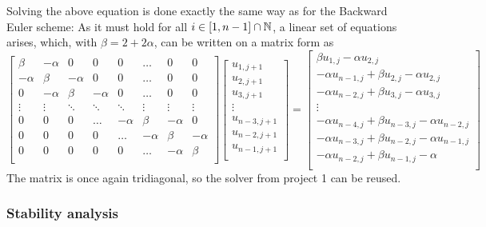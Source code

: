 \documentclass[12pt,english,a4paper]{article}
\begin{document}
Solving the above equation is done exactly the same way as for the Backward Euler scheme: As it must hold for all \(i\in\qty[1,n-1]\cap\mathbb{N}\), a linear set of equations arises, which, with \(\beta=2+2\alpha\), can be written on a matrix form as
\[
    \begin{bmatrix}
        \beta & -\alpha & 0 & 0 & 0 & \dots & 0 & 0  \\
        -\alpha & \beta & -\alpha & 0 & 0 & \dots & 0 & 0  \\
        0 & -\alpha & \beta & -\alpha & 0 & \dots & 0 & 0 \\
        \vdots & \vdots &  \ddots & \ddots & \ddots & \vdots & \vdots & \vdots\\
        0 & 0 & 0 & \dots & -\alpha & \beta & - \alpha & 0\\
        0 & 0 & 0 & 0 & \dots & -\alpha & \beta & - \alpha\\
        0 & 0 & 0 & 0 & 0 & \dots & -\alpha & \beta\\
    \end{bmatrix}
    \begin{bmatrix}
        u_{1,j+1}\\
        u_{2,j+1}\\
        u_{3,j+1}\\
        \vdots\\
        u_{n-3,j+1}\\
        u_{n-2,j+1}\\
        u_{n-1,j+1}\\
    \end{bmatrix}
    =
    \begin{bmatrix}
        \beta u_{1,j} - \alpha u_{2,j}\\
        -\alpha u_{n-1,j} + \beta u_{2,j} - \alpha u_{2,j}\\
        -\alpha u_{n-2,j} + \beta u_{3,j} - \alpha u_{3,j}\\
        \vdots\\
        -\alpha u_{n-4,j} + \beta u_{n-3,j} - \alpha u_{n-2,j}\\
        -\alpha u_{n-3,j} + \beta u_{n-2,j} - \alpha u_{n-1,j}\\
        -\alpha u_{n-2,j} + \beta u_{n-1,j} - \alpha\\
    \end{bmatrix}
\]
The matrix is once again tridiagonal, so the solver from project 1 can be reused.

\subsubsection{Stability analysis}




\clearpage
{}
\printbibliography
\end{document}
